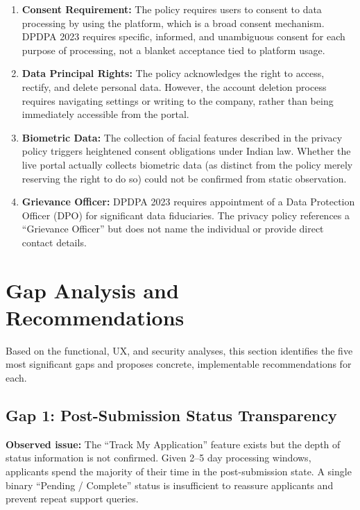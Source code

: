 \documentclass[journal, 10pt, twoside]{IEEEtran}
\begin{document}
\begin{enumerate}
  \item \textbf{Consent Requirement:} The policy requires users to
  consent to data processing by using the platform, which is a
  broad consent mechanism. DPDPA 2023 requires specific, informed,
  and unambiguous consent for each purpose of processing, not a blanket
  acceptance tied to platform usage.

  \item \textbf{Data Principal Rights:} The policy acknowledges the
  right to access, rectify, and delete personal data. However, the
  account deletion process requires navigating settings or writing to
  the company, rather than being immediately accessible from the portal.

  \item \textbf{Biometric Data:} The collection of facial features
  described in the privacy policy triggers heightened consent obligations
  under Indian law. Whether the live portal actually collects biometric
  data (as distinct from the policy merely reserving the right to do so)
  could not be confirmed from static observation.

  \item \textbf{Grievance Officer:} DPDPA 2023 requires appointment of
  a Data Protection Officer (DPO) for significant data fiduciaries.
  The privacy policy references a ``Grievance Officer'' but does not
  name the individual or provide direct contact details.
\end{enumerate}

\section{Gap Analysis and Recommendations}
\label{sec:gaps}

Based on the functional, UX, and security analyses, this section
identifies the five most significant gaps and proposes concrete,
implementable recommendations for each.

\subsection{Gap 1: Post-Submission Status Transparency}
\textbf{Observed issue:} The ``Track My Application'' feature exists
but the depth of status information is not confirmed. Given 2--5 day
processing windows, applicants spend the majority of their time in
the post-submission state. A single binary ``Pending / Complete''
status is insufficient to reassure applicants and prevent repeat
support queries.
\end{document}
